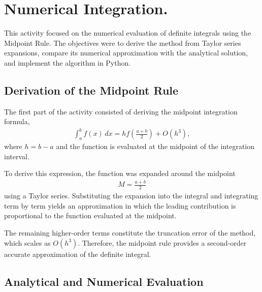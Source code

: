 \documentclass[../portafolio.tex]{subfiles}
\begin{document}
\section{Numerical Integration.}   %


\medskip
This activity focused on the numerical evaluation of definite integrals using the Midpoint Rule. The objectives were to derive the method from Taylor series expansions, compare its numerical approximation with the analytical solution, and implement the algorithm in Python.


\subsection{Derivation of the Midpoint Rule}

The first part of the activity consisted of deriving the midpoint integration formula,
\begin{align*}
\int_a^b f(x) \, dx = hf\left(\frac{a+b}{2}\right) + O(h^3),
\end{align*}
where $h=b-a$ and the function is evaluated at the midpoint of the integration interval.

To derive this expression, the function was expanded around the midpoint
\begin{align*}
M=\frac{a+b}{2}
\end{align*}
using a Taylor series. Substituting the expansion into the integral and integrating term by term yields an approximation in which the leading contribution is proportional to the function evaluated at the midpoint.

The remaining higher-order terms constitute the truncation error of the method, which scales as $O(h^3)$. Therefore, the midpoint rule provides a second-order accurate approximation of the definite integral.

\subsection{Analytical and Numerical Evaluation}
\end{document}
